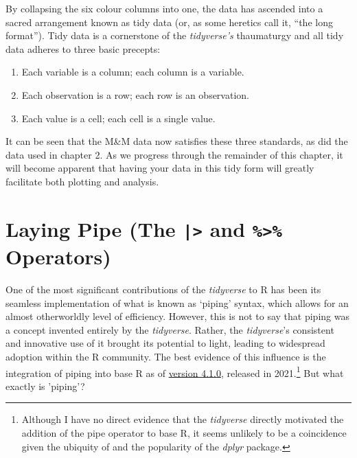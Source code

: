 By collapsing the six colour columns into one, the data has ascended into a sacred arrangement known as \gls{tidy data} (or, as some heretics call it, ``the long format'').  Tidy data is a cornerstone of the \textit{tidyverse's} thaumaturgy and all tidy data adheres to three basic precepts:

\begin{minipage}{\textwidth}

\begin{enumerate}[label=\Roman*.]
\selectfont
    \item Each variable is a column; each column is a variable.
    \item Each observation is a row; each row is an observation.
    \item Each value is a cell; each cell is a single value.
\end{enumerate}
\end{minipage}

\noindent
It can be seen that the M\&M data now satisfies these three standards, as did the  data used in chapter 2. As we progress through the remainder of this chapter, it will become apparent that having your data in this tidy form will greatly facilitate both plotting and analysis. 


\section{Laying Pipe (The \texttt{|>} and \texttt{\%>\%} Operators)}

One of the most significant contributions of the \textit{tidyverse} to R has been its seamless implementation of what is known as `piping' syntax, which allows for an almost otherworldly level of efficiency. However, this is not to say that piping was a concept invented entirely by the \textit{tidyverse}. Rather, the \textit{tidyverse}'s consistent and innovative use of it brought its potential to light, leading to widespread adoption within the R community. The best evidence of this influence is the integration of piping into base R as of \href{https://stat.ethz.ch/pipermail/r-announce/2021/000670.html}{version 4.1.0}, released in 2021.\footnote{Although I have no direct evidence that the \textit{tidyverse} directly motivated the addition of the pipe operator to base R, it seems unlikely to be a coincidence given the ubiquity of \R{\%>\%} and the popularity of the \textit{dplyr} package.} But what exactly is 'piping'?


